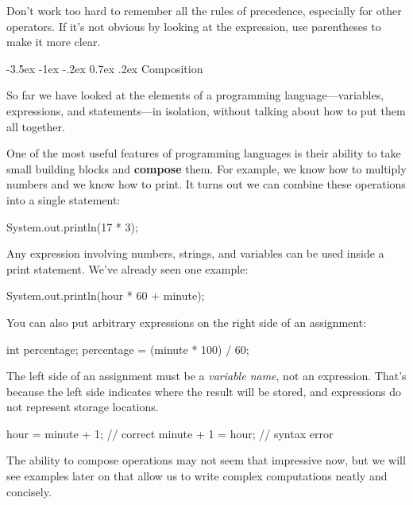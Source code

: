\documentclass[12pt]{book}
\makeatletter
\theoremstyle{exercise}
\renewcommand{\section}{\@startsection{section}{1}{\z@}%
    {-3.5ex \@plus -1ex \@minus -.2ex}%
    {0.7ex \@plus.2ex}%
    {\normalfont\Large\bfseries}}
\makeatother
\begin{document}
Don't work too hard to remember all the rules of precedence, especially for other operators.
If it's not obvious by looking at the expression, use parentheses to make it more clear.


\section{Composition}


So far we have looked at the elements of a programming language---variables, expressions, and statements---in isolation, without talking about how to put them all together.

One of the most useful features of programming languages is their ability to take small building blocks and {\bf compose} them.
For example, we know how to multiply numbers and we know how to print.
It turns out we can combine these operations into a single statement:

\begin{code}
    System.out.println(17 * 3);
\end{code}

Any expression involving numbers, strings, and variables can be used inside a print statement.
We've already seen one example:

\begin{code}
    System.out.println(hour * 60 + minute);
\end{code}

You can also put arbitrary expressions on the right side of an assignment:

\begin{code}
    int percentage;
    percentage = (minute * 100) / 60;
\end{code}

The left side of an assignment must be a {\em variable name}, not an expression.
That's because the left side indicates where the result will be stored, and expressions do not represent storage locations.

\begin{code}
    hour = minute + 1;  // correct
    minute + 1 = hour;  // syntax error
\end{code}


The ability to compose operations may not seem that impressive now, but we will see examples later on that allow us to write complex computations neatly and concisely.
\end{document}
